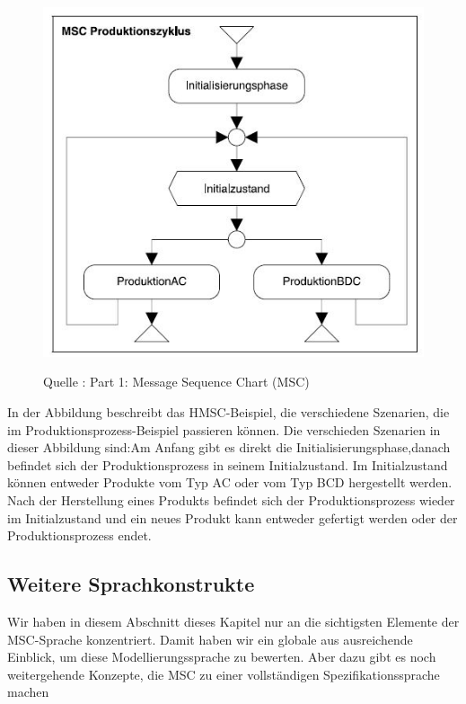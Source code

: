 \begin{center}
\begin{figure}[h]
   

\includegraphics[scale=1]{Graphics/HMSC.jpg}



Quelle : \cite{MT009}
Part 1: Message Sequence Chart (MSC) 

 
\label{fig9}


\end{figure}

\end{center}
\newpage
In der Abbildung beschreibt das HMSC-Beispiel, die verschiedene Szenarien, die im Produktionsprozess-Beispiel passieren können. 
Die verschieden Szenarien in dieser Abbildung sind:Am Anfang gibt es direkt die Initialisierungsphase,danach
befindet sich der Produktionsprozess in seinem
Initialzustand. Im Initialzustand können entweder Produkte
vom Typ AC oder vom Typ BCD hergestellt werden. Nach
der Herstellung eines Produkts befindet sich der Produktionsprozess
wieder im Initialzustand und ein neues Produkt
kann entweder gefertigt werden oder der Produktionsprozess endet.

\subsection{Weitere Sprachkonstrukte}
Wir haben in diesem Abschnitt dieses Kapitel nur an die sichtigsten Elemente der MSC-Sprache konzentriert. Damit haben wir ein globale aus ausreichende Einblick, um diese Modellierungssprache zu bewerten. Aber dazu gibt es noch weitergehende Konzepte, die MSC zu einer vollständigen Spezifikationssprache machen






